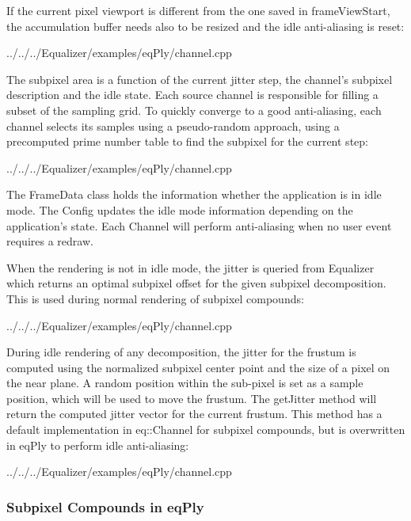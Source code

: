 \documentclass[10pt,a4]{scrartcl}
\begin{document}
If the current pixel viewport is different from the one saved in
\textsf{frameViewStart}, the accumulation buffer needs also to be resized and
the idle anti-aliasing is reset:

{\footnotesize
  {../../../Equalizer/examples/eqPly/channel.cpp}}

The subpixel area is a function of the current jitter step, the channel's
\textsf{subpixel} description and the idle state. Each source channel is
responsible for filling a subset of the sampling grid. To quickly converge to a
good anti-aliasing, each channel selects its samples using a pseudo-random
approach, using a precomputed prime number table to find the subpixel for the
current step:

{\footnotesize
  {../../../Equalizer/examples/eqPly/channel.cpp}}

The \textsf{FrameData} class holds the information whether the application is in
idle mode. The \textsf{Config} updates the idle mode information depending on
the application's state.  Each \textsf{Channel} will perform anti-aliasing when
no user event requires a redraw.

When the rendering is not in idle mode, the jitter is queried from
Equalizer which returns an optimal subpixel offset for the given subpixel
decomposition. This is used during normal rendering of subpixel compounds:

{\footnotesize
  {../../../Equalizer/examples/eqPly/channel.cpp}}

During idle rendering of any decomposition, the jitter for the frustum is
computed using the normalized subpixel center point and the size of a pixel on
the near plane. A random position within the sub-pixel is set as a sample
position, which will be used to move the frustum. The \textsf{getJitter} method
will return the computed jitter vector for the current frustum. This method has
a default implementation in \textsf{eq::Channel} for subpixel compounds, but is
overwritten in \textsf{eqPly} to perform idle anti-aliasing:

{\footnotesize
  {../../../Equalizer/examples/eqPly/channel.cpp}}


\subsubsection{Subpixel Compounds in eqPly}
\end{document}
